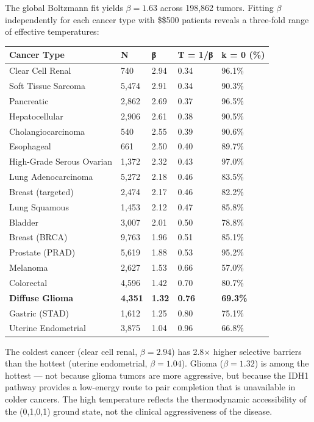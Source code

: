 \documentclass[
  11pt,
]{article}
\newcounter{none} %
\begin{document}
The global Boltzmann fit yields \(\beta = 1.63\) across 198,862 tumors.
Fitting \(\beta\) independently for each cancer type with \$\geq\$500
patients reveals a three-fold range of effective temperatures:

{\def\LTcaptype{none} %
\begin{longtable}[]{@{}lllll@{}}
\toprule\noalign{}
Cancer Type & N & β & T = 1/β & k = 0 (\%) \\
\midrule\noalign{}
\endhead
\bottomrule\noalign{}
\endlastfoot
Clear Cell Renal & 740 & 2.94 & 0.34 & 96.1\% \\
Soft Tissue Sarcoma & 5,474 & 2.91 & 0.34 & 90.3\% \\
Pancreatic & 2,862 & 2.69 & 0.37 & 96.5\% \\
Hepatocellular & 2,906 & 2.61 & 0.38 & 90.5\% \\
Cholangiocarcinoma & 540 & 2.55 & 0.39 & 90.6\% \\
Esophageal & 661 & 2.50 & 0.40 & 89.7\% \\
High-Grade Serous Ovarian & 1,372 & 2.32 & 0.43 & 97.0\% \\
Lung Adenocarcinoma & 5,272 & 2.18 & 0.46 & 83.5\% \\
Breast (targeted) & 2,474 & 2.17 & 0.46 & 82.2\% \\
Lung Squamous & 1,453 & 2.12 & 0.47 & 85.8\% \\
Bladder & 3,007 & 2.01 & 0.50 & 78.8\% \\
Breast (BRCA) & 9,763 & 1.96 & 0.51 & 85.1\% \\
Prostate (PRAD) & 5,619 & 1.88 & 0.53 & 95.2\% \\
Melanoma & 2,627 & 1.53 & 0.66 & 57.0\% \\
Colorectal & 4,596 & 1.42 & 0.70 & 80.7\% \\
\textbf{Diffuse Glioma} & \textbf{4,351} & \textbf{1.32} & \textbf{0.76}
& \textbf{69.3\%} \\
Gastric (STAD) & 1,612 & 1.25 & 0.80 & 75.1\% \\
Uterine Endometrial & 3,875 & 1.04 & 0.96 & 66.8\% \\
\end{longtable}
}

The coldest cancer (clear cell renal, \(\beta = 2.94\)) has 2.8× higher
selective barriers than the hottest (uterine endometrial,
\(\beta = 1.04\)). Glioma (\(\beta = 1.32\)) is among the hottest ---
not because glioma tumors are more aggressive, but because the IDH1
pathway provides a low-energy route to pair completion that is
unavailable in colder cancers. The high temperature reflects the
thermodynamic accessibility of the (0,1,0,1) ground state, not the
clinical aggressiveness of the disease.
\end{document}
